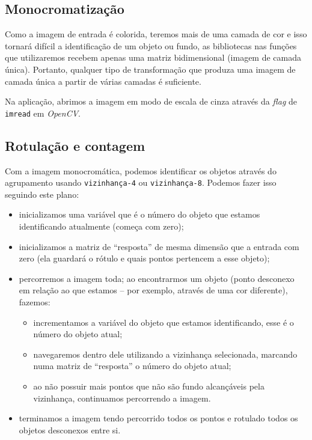 \documentclass[brazilian,a4paper,twocolumn]{article}
\begin{document}
    \subsection{Monocromatização}

        Como a imagem de entrada é colorida, teremos mais de uma camada de cor e isso tornará difícil a identificação de um objeto ou fundo, as bibliotecas nas funções que utilizaremos recebem apenas uma matriz bidimensional (imagem de camada única). Portanto, qualquer tipo de transformação que produza uma imagem de camada única a partir de várias camadas é suficiente.

        Na aplicação, abrimos a imagem em modo de escala de cinza através da \textit{flag} de \texttt{imread} em \emph{OpenCV}.

    \subsection{Rotulação e contagem}
    \label{sec:metodo-rotulacao}

        Com a imagem monocromática, podemos identificar os objetos através do agrupamento usando \texttt{vizinhança-4} ou \texttt{vizinhança-8}. Podemos fazer isso seguindo este plano:
        \begin{itemize}
            \item inicializamos uma variável que é o número do objeto que estamos identificando atualmente (começa com zero);
            \item inicializamos a matriz de ``resposta'' de mesma dimensão que a entrada com zero (ela guardará o rótulo e quais pontos pertencem a esse objeto);
            \item percorremos a imagem toda; ao encontrarmos um objeto (ponto desconexo em relação ao que estamos -- por exemplo, através de uma cor diferente), fazemos:
            \begin{itemize}
                \item incrementamos a variável do objeto que estamos identificando, esse é o número do objeto atual;
                \item navegaremos dentro dele utilizando a vizinhança selecionada, marcando numa matriz de ``resposta'' o número do objeto atual;
                \item ao não possuir mais pontos que não são fundo alcançáveis pela vizinhança, continuamos percorrendo a imagem.
            \end{itemize}
            \item terminamos a imagem tendo percorrido todos os pontos e rotulado todos os objetos desconexos entre si.
        \end{itemize}
\end{document}
